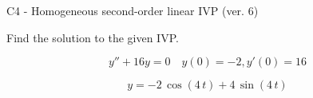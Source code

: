 \begin{exercise}
  \begin{exerciseTitle}C4 - Homogeneous second-order linear IVP (ver. 6)\end{exerciseTitle}
  \begin{exerciseStatement}
    
Find the solution to the given IVP.

    
\[y''+16y = 0 \hspace{1em} y(0) = -2 , y'(0) = 16\]

  \end{exerciseStatement}
  \begin{exerciseAnswer}
    
\[y= -2 \, \cos\left(4 \, t\right) + 4 \, \sin\left(4 \, t\right)\]

  \end{exerciseAnswer}
\end{exercise}